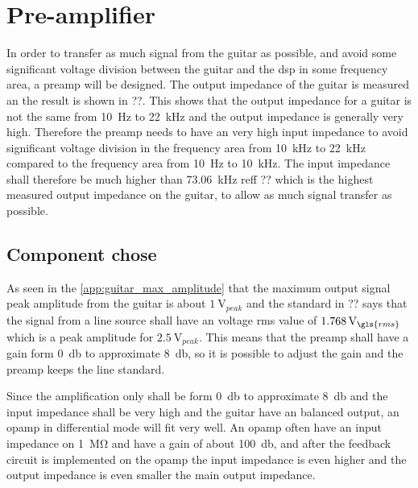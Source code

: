 \section{Pre-amplifier}
In order to transfer as much signal from the guitar as possible, and avoid some significant voltage division between the guitar and the \gls{dsp} in some frequency area, a \gls{preamp} will be designed. The output impedance of the guitar is measured an the result is shown in ??. This shows that the output impedance for a guitar is not the same from \SI{10}{\hertz} to \SI{22}{\kilo\hertz} and the output impedance is generally very high. Therefore the \gls{preamp} needs to have an very high input impedance to avoid significant voltage division in the frequency area from \SI{10}{\kilo\hertz} to \SI{22}{\kilo\hertz} compared to the frequency area from \SI{10}{\hertz} to \SI{10}{\kilo\hertz}. The input impedance shall therefore be much higher than \SI{73.06}{\kilo\hertz} reff ?? which is the highest measured output impedance on the guitar, to allow as much signal transfer as possible.

\subsection{Component chose}

As seen in the \autoref{app:guitar_max_amplitude} that the maximum output signal peak amplitude from the guitar is about $\SI{1}{\volt}_{peak}$ and the standard in ?? says that the signal from a line source shall have an voltage \gls{rms} value of $\SI{1.768}{\volt}_{\gls{rms}}$ which is a peak amplitude for $\SI{2.5}{\volt}_{peak}$. This means that the \gls{preamp} shall have a gain form \SI{0}{\decibel} to approximate \SI{8}{\decibel}, so it is possible to adjust the gain and the \gls{preamp} keeps the line standard. 

Since the amplification only shall be form \SI{0}{\decibel} to approximate \SI{8}{\decibel} and the input impedance shall be very high and the guitar have an balanced output, an \gls{opamp} in differential mode will fit very well. An \gls{opamp} often have an input impedance on \SI{1}{\mega\ohm} and have a gain of about \SI{100}{\decibel}, and after the feedback circuit is implemented on the \gls{opamp} the input impedance is even higher and the output impedance is even smaller the main output impedance.

